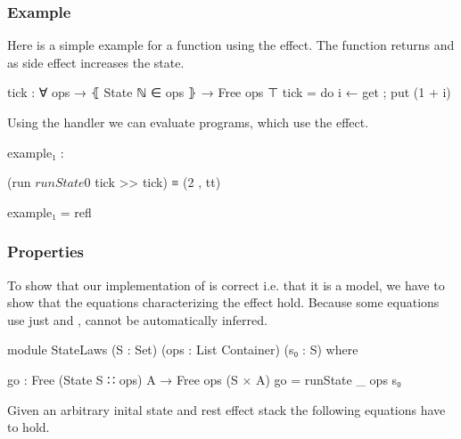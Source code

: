 

\subsubsection{Example}

Here is a simple example for a function using the 
effect.
The function  returns  and
as side effect increases the state.

\begin{code}
tick : ∀ {ops} → ⦃ State ℕ ∈ ops ⦄ → Free ops ⊤
tick = do i ← get ; put (1 + i)
\end{code}
Using the  handler we can evaluate programs, which use
the  effect.

\begin{center}
\begin{code}
example₁ :
\end{code}
\begin{code}[inline]
 (run $ runState 0 $ tick >> tick) ≡ (2 , tt)
\end{code}
\begin{code}
example₁ = refl
\end{code}
\end{center}


\subsubsection{Properties}

To show that our implementation of  is correct i.e. that it
is a model, we have to show that the equations characterizing the effect hold.
Because some equations use just  and ,
 cannot be automatically inferred.

\begin{code}
module StateLaws (S : Set) (ops : List Container) (s₀ : S) where
\end{code}
\begin{code}
  go : Free (State S ∷ ops) A → Free ops (S × A)
  go = runState {_} {ops} s₀
\end{code}
Given an arbitrary inital state  and rest effect stack
 the following equations have to hold.


